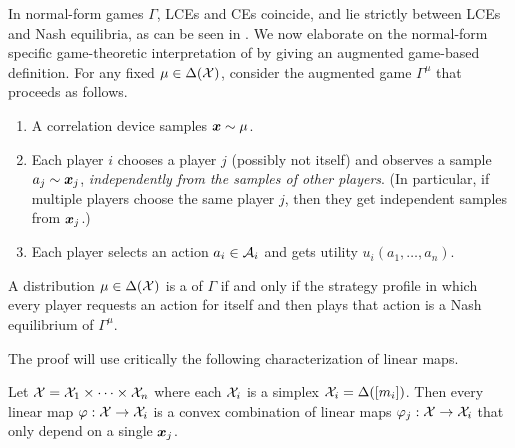 In normal-form games $\Gamma$, LCEs and CEs coincide, and \jlces lie strictly between LCEs and Nash equilibria, as can be seen in . We now elaborate on the normal-form specific game-theoretic interpretation of \jlces by giving an augmented game-based definition. For any fixed $\mu \in \Delta({\mathcal{X}})$, consider the augmented game $\Gamma^\mu$ that proceeds as follows.
\begin{enumerate}
    \item A correlation device samples ${\bm{x}}\sim\mu$. 
    \item Each player $i$ chooses a player $j$ (possibly not itself) and observes a sample $a_j \sim {\bm{x}}_j$, {\em independently from the samples of other players}. (In particular, if multiple players choose the same player $j$, then they get independent samples from ${\bm{x}}_j$.)
    \item Each player selects an action $a_i \in {\mathcal{A}}_i$ and gets utility $u_i(a_1, \dots, a_n)$.
\end{enumerate}
\begin{proposition}\label{prop:joint lce augmented}
    A distribution $\mu \in \Delta({\mathcal{X}})$ is a \jlce of $\Gamma$ if and only if the strategy profile in which every player requests an action for itself and then plays that action is a Nash equilibrium of $\Gamma^\mu$. 
\end{proposition}
The proof will use critically the following characterization of linear maps. 
\begin{lemma}\label{lem:fujii}
    Let ${\mathcal{X}} = {\mathcal{X}}_1 \times \dots\times {\mathcal{X}}_n$ where each ${\mathcal{X}}_i$ is a simplex ${\mathcal{X}}_i = \Delta([m_i])$. Then every linear map $\varphi : {\mathcal{X}} \to {\mathcal{X}}_i$ is a convex combination of linear maps $\varphi_j : {\mathcal{X}} \to {\mathcal{X}}_i$ that only depend on a single ${\bm{x}}_j$.
\end{lemma}
